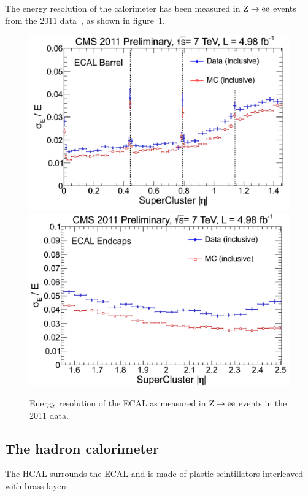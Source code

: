 The energy resolution of the calorimeter has been measured in $\mathrm{Z}
\rightarrow \mathrm{e}\mathrm{e}$ events from the 2011 data~\cite{CMS-DP-2012-007}, as shown in
figure~\ref{fig:ecal_resolution}.

\begin{figure}[htb]
    \centering
    \includegraphics[width=.48\textwidth]{images/pdf/ecal_barrel_resolution}
    \includegraphics[width=.48\textwidth]{images/pdf/ecal_endcap_resolution}
    \caption{Energy resolution of the ECAL as measured in $\mathrm{Z} \rightarrow
    \mathrm{e}\mathrm{e}$ events in the 2011 data.}
    \label{fig:ecal_resolution}
\end{figure}

\subsection{The hadron calorimeter}
The HCAL surrounds the ECAL and is made of plastic scintillators interleaved with brass layers.
